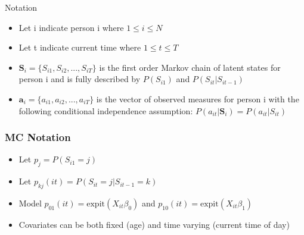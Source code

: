 \documentclass{beamer}
\begin{document}
\begin{frame}{Notation}
\begin{itemize}
    \item Let i indicate person i where $1 \leq i \leq N$
    \item Let t indicate current time where $1 \leq t \leq T$
    \item  $\textbf{S}_i = \{S_{i1}, S_{i2}, ..., S_{iT}\}$ is the first order Markov chain of latent states for person i and is fully described by $P(S_{i1})$ and $P(S_{it}|S_{it-1})$
    \item $\textbf{a}_i = \{a_{i1}, a_{i2}, ..., a_{iT}\}$ is the vector of observed measures for person i with the following conditional independence assumption: $P(a_{it}|\textbf{S}_i) = P(a_{it}|S_{it})$
\end{itemize}
\end{frame}


\begin{frame}
\frametitle{MC Notation}
\begin{itemize}
    \item Let $p_{j} = P(S_{i1} = j)$
    \item Let $p_{kj}(it) = P(S_{it} = j|S_{it-1} = k)$
    \item Model $p_{01}(it) = \text{expit}(X_{it}\beta_0)$ and $p_{10}(it) = \text{expit}(X_{it}\beta_1)$
    \item Covariates can be both fixed (age) and time varying (current time of day)
\end{itemize}
\end{frame}

\end{document}

